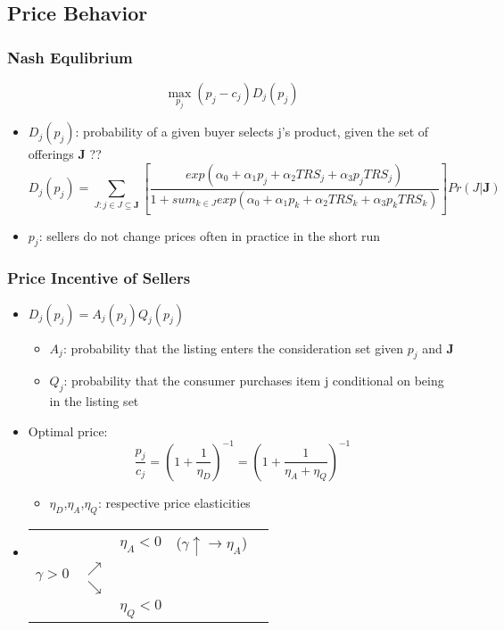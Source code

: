 \documentclass{beamer}
\begin{document}
\subsection{Price Behavior}
\begin{frame}
\frametitle{Nash Equlibrium}
$$
\max_{p_j}(p_j-c_j)D_j(p_j)
$$
\begin{itemize}
\item $D_j(p_j)$: probability of a given buyer selects j's product, given the set of offerings $\mathbf{J}$ ??
\footnotesize{
$$
D_j(p_j) = \sum_{J: j\in J \subseteq \mathbf{J}}
[
\frac{exp( \alpha_0+\alpha_1 p_j + \alpha_2 TRS_j+ \alpha_3 p_j TRS_j)}{1+sum_{k\in J}exp( \alpha_0+\alpha_1 p_k + \alpha_2 TRS_k+ \alpha_3 p_k TRS_k)}
]
Pr(J|\mathbf{J})
$$
}
\normalsize
\item $p_j$: sellers do not change prices often in practice in the short run
\end{itemize}
\end{frame}

\begin{frame}[allowframebreaks]
\frametitle{Price Incentive of Sellers}
\begin{itemize}
\item $D_j(p_j)=A_j(p_j)Q_j(p_j)$
  \begin{itemize}
  \item $A_j$:  probability that the listing enters the consideration set given $p_j$ and $\mathbf{J}$ 
  \item $Q_j$: probability that the consumer purchases item j conditional on being in the listing set
  \end{itemize}
\item Optimal price:
$$
\frac{p_j}{c_j}
=(1+\frac{1}{\eta_D})^{-1}
=(1+\frac{1}{\eta_A+\eta_Q})^{-1}
$$
  \begin{itemize}
  \item $\eta_D$,$\eta_A$,$\eta_Q$: respective price elasticities
  \end{itemize}
\framebreak
\item 
\begin{tabular}{lllll}
\multirow{4}{1cm}{$\gamma>0$} 
& & $\eta_A < 0$ &($\gamma \uparrow \to \eta_A$) \\
& $\nearrow$ & \\
& $\searrow$ & \\
& & $\eta_Q < 0$ \\
\end{tabular}
\end{itemize}
\end{frame}
\end{document}
